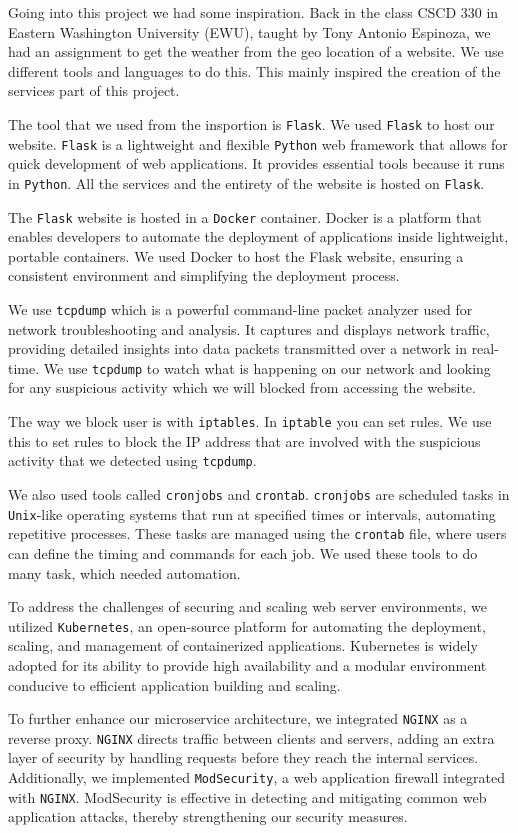 Going into this project we had some inspiration. Back in the class CSCD 330 in Eastern Washington University (EWU), taught by Tony Antonio Espinoza, we had an assignment to get the weather from the geo location of a website. We use different tools and languages to do this. This mainly inspired the creation of the services part of this project.

The tool that we used from the insportion is \verb+Flask+. We used \verb+Flask+ to host our website. \verb+Flask+ is a lightweight and flexible \verb+Python+ web framework that allows for quick development of web applications. It provides essential tools because it runs in \verb+Python+. All the services and the entirety of the website is hosted on \verb+Flask+. 

The \verb+Flask+ website is hosted in a \verb+Docker+ container. Docker is a platform that enables developers to automate the deployment of applications inside lightweight, portable containers. We used Docker to host the Flask website, ensuring a consistent environment and simplifying the deployment process.

We use \verb+tcpdump+ which is a powerful command-line packet analyzer used for network troubleshooting and analysis. It captures and displays network traffic, providing detailed insights into data packets transmitted over a network in real-time. We use \verb+tcpdump+ to watch what is happening on our network and looking for any suspicious activity which we will blocked from accessing the website.

The way we block user is with \verb+iptables+. In \verb+iptable+ you can set rules. We use this to set rules to block the IP address that are involved with the suspicious activity that we detected using \verb+tcpdump+.

We also used tools called \verb+cronjobs+ and \verb+crontab+. \verb+cronjobs+ are scheduled tasks in \verb+Unix+-like operating systems that run at specified times or intervals, automating repetitive processes. These tasks are managed using the \verb+crontab+ file, where users can define the timing and commands for each job. We used these tools to do many task, which needed automation.

To address the challenges of securing and scaling web server environments, we utilized \verb+Kubernetes+, an open-source platform for automating the deployment, scaling, and management of containerized applications. Kubernetes is widely adopted for its ability to provide high availability and a modular environment conducive to efficient application building and scaling. 

To further enhance our microservice architecture, we integrated \verb+NGINX+ as a reverse proxy. \verb+NGINX+ directs traffic between clients and servers, adding an extra layer of security by handling requests before they reach the internal services. Additionally, we implemented \verb+ModSecurity+, a web application firewall integrated with \verb+NGINX+. ModSecurity is effective in detecting and mitigating common web application attacks, thereby strengthening our security measures.
